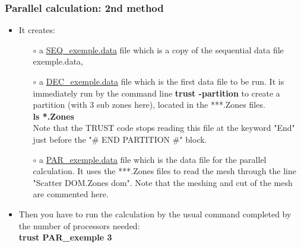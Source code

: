 \documentclass[10pt, hyperref={unicode=true,pdfusetitle, bookmarks=true,bookmarksnumbered=false,bookmarksopen=false, breaklinks=false,pdfborder={0 0 1},backref=true,colorlinks=true,linkcolor=darkblue,pageanchor}]{beamer}
\begin{document}
\begin{frame}
\frametitle{Parallel calculation: 2nd method}
\begin{block}{}

\begin{itemize}
\item It creates:
    \begin{itemize} 
    \item [$\circ$] a \underline{SEQ\_exemple.data} file which is a copy of the sequential data file exemple.data,
    \item [$\circ$] a \underline{DEC\_exemple.data} file which is the first data file to be run. It is immediately run by the command line \textbf{trust -partition} to create a partition (with 3 sub zones here), located in the ***.Zones files. \\
    \textbf{ls *.Zones}\\
    Note that the TRUST code stops reading this file at the keyword "End" just before the "\# END PARTITION \#" block.
    \item [$\circ$] a \underline{PAR\_exemple.data} file which is the data file for the parallel calculation. It uses the ***.Zones files to read the mesh through the line "Scatter DOM.Zones dom". Note that the meshing and cut of the mesh are commented here.
    \end{itemize}

\item Then you have to run the calculation by the usual command completed by the number of processors needed:\\
\textbf{trust PAR\_exemple 3}
\end{itemize}

\end{block}
\end{frame}
\end{document}
